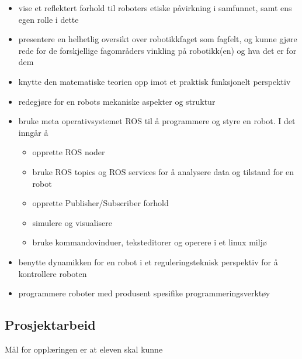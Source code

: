     \begin{itemize}
        \item vise et reflektert forhold til roboters etiske påvirkning i samfunnet, samt ens egen rolle i dette
        \item presentere en helhetlig oversikt over robotikkfaget som fagfelt, og kunne gjøre rede for de forskjellige fagområders vinkling på robotikk(en) og hva det er for dem
        \item knytte den matematiske teorien opp imot et praktisk funksjonelt perspektiv
        \item redegjøre for en robots mekaniske aspekter og struktur
        \item bruke meta operativsystemet ROS til å programmere og styre en robot. I det inngår å
            \begin{itemize}
                \item opprette ROS noder
                \item bruke ROS topics og ROS services for å analysere data og tilstand for en robot
                \item opprette Publisher/Subscriber forhold
                \item simulere og visualisere
                \item bruke kommandovinduer, teksteditorer og operere i et linux miljø
            \end{itemize}
        \item benytte dynamikken for en robot i et reguleringsteknisk perspektiv for å kontrollere roboten
        \item programmere roboter med produsent spesifike programmeringsverktøy
    \end{itemize}


\subsection*{Prosjektarbeid}

    Mål for opplæringen er at eleven skal kunne

